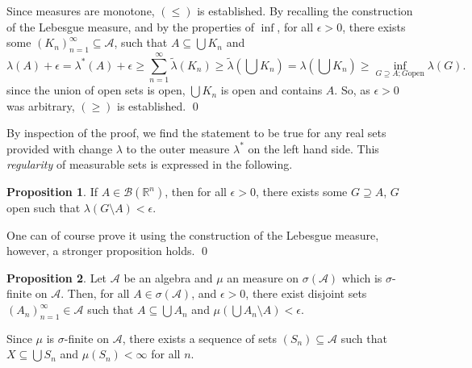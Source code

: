 \documentclass[
]{article}
\theoremstyle{definition}
\newtheorem{prop}{Proposition}
\theoremstyle{definition}
\begin{document}
Since measures are monotone, \((\le)\) is established. By recalling the
construction of the Lebesgue measure, and by the properties of \(\inf\),
for all \(\epsilon > 0\), there exists some
\((K_n)_{n = 1}^\infty \subseteq \mathcal{A}\), such that
\(A \subseteq \bigcup K_n\) and
\[\lambda(A) + \epsilon = \lambda^*(A) + \epsilon \ge 
    \sum_{n = 1}^\infty \tilde\lambda (K_n) \ge 
    \tilde\lambda\left(\bigcup K_n\right) = \lambda\left(\bigcup K_n\right)
    \ge \inf_{G \supseteq A; G \text{open}} \lambda(G).\] since the
union of open sets is open, \(\bigcup K_n\) is open and contains \(A\).
So, as \(\epsilon > 0\) was arbitrary, \((\ge)\) is established. \qed

By inspection of the proof, we find the statement to be true for any
real sets provided with change \(\lambda\) to the outer measure
\(\lambda^*\) on the left hand side. This \emph{regularity} of
measurable sets is expressed in the following.

\begin{prop}\label{exist_open_near}
  If \(A \in \mathcal{B}(\mathbb{R}^n)\), then for all \(\epsilon > 0\), there 
  exists some \(G \supseteq A\), \(G\) open such that \(\lambda(G \setminus A) < \epsilon\).
\end{prop}
\proof

One can of course prove it using the construction of the Lebesgue
measure, however, a stronger proposition holds. \qed

\begin{prop}
  Let \(\mathcal{A}\) be an algebra and \(\mu\) an measure on \(\sigma(\mathcal{A})\) 
  which is \(\sigma\)-finite on \(\mathcal{A}\). Then, for all \(A \in \sigma(\mathcal{A})\), 
  and \(\epsilon > 0\), there exist disjoint sets \((A_n)_{n = 1}^\infty \in \mathcal{A}\) 
  such that \(A \subseteq \bigcup A_n\) and 
  \(\mu\left(\bigcup A_n \setminus A\right) < \epsilon\).
\end{prop}
\proof

Since \(\mu\) is \(\sigma\)-finite on \(\mathcal{A}\), there exists a
sequence of sets \((S_n) \subseteq \mathcal{A}\) such that
\(X \subseteq \bigcup S_n\) and \(\mu(S_n) < \infty\) for all \(n\).
\end{document}
